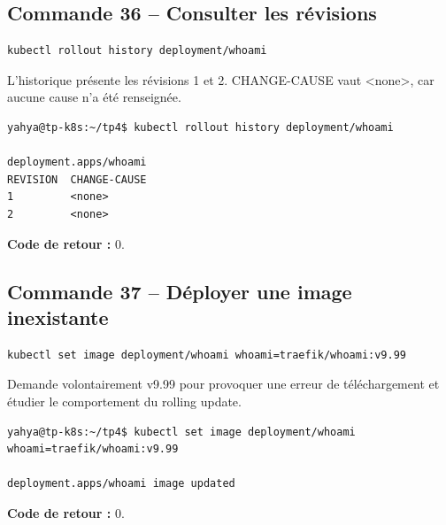 \documentclass[11pt,a4paper]{article}
\begin{document}
\subsection{Commande 36 -- Consulter les révisions}
\begin{lstlisting}
kubectl rollout history deployment/whoami
\end{lstlisting}
L’historique présente les révisions 1 et 2. CHANGE-CAUSE vaut <none>, car aucune cause n’a été renseignée.
\begin{tcolorbox}[terminal,title={Ubuntu / WSL2 -- Commande 36 -- rendu reconstitué}]
\begin{Verbatim}[fontsize=\scriptsize,breaklines=true,breakanywhere=true,breaksymbolleft={},breaksymbolright={}]
yahya@tp-k8s:~/tp4$ kubectl rollout history deployment/whoami

deployment.apps/whoami 
REVISION  CHANGE-CAUSE
1         <none>
2         <none>
\end{Verbatim}
\end{tcolorbox}
\textbf{Code de retour :} 0.

\subsection{Commande 37 -- Déployer une image inexistante}
\begin{lstlisting}
kubectl set image deployment/whoami whoami=traefik/whoami:v9.99
\end{lstlisting}
Demande volontairement v9.99 pour provoquer une erreur de téléchargement et étudier le comportement du rolling update.
\begin{tcolorbox}[terminal,title={Ubuntu / WSL2 -- Commande 37 -- rendu reconstitué}]
\begin{Verbatim}[fontsize=\scriptsize,breaklines=true,breakanywhere=true,breaksymbolleft={},breaksymbolright={}]
yahya@tp-k8s:~/tp4$ kubectl set image deployment/whoami whoami=traefik/whoami:v9.99

deployment.apps/whoami image updated
\end{Verbatim}
\end{tcolorbox}
\textbf{Code de retour :} 0.
\end{document}
